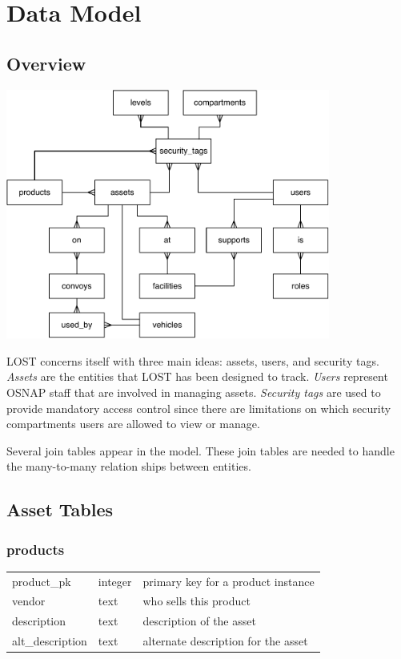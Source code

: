 \chapter*{Data Model}
\section*{Overview}
\begin{center}
\includegraphics[width=0.8\textwidth]{./erd.pdf}
\end{center}
LOST concerns itself with three main ideas: assets, users, and security tags. \emph{Assets} are the entities that LOST has been designed to track. \emph{Users} represent OSNAP staff that are involved in managing assets. \emph{Security tags} are used to provide mandatory access control since there are limitations on which security compartments users are allowed to view or manage.

Several join tables appear in the model. These join tables are needed to handle the many-to-many relation ships between entities. 


\section*{Asset Tables}

\subsection*{products}
\begin{tabular}{l|l|l}
\hline
product\_pk & integer & primary key for a product instance \\
vendor & text & who sells this product \\
description & text & description of the asset \\
alt\_description & text & alternate description for the asset \\
\hline
\end{tabular}

